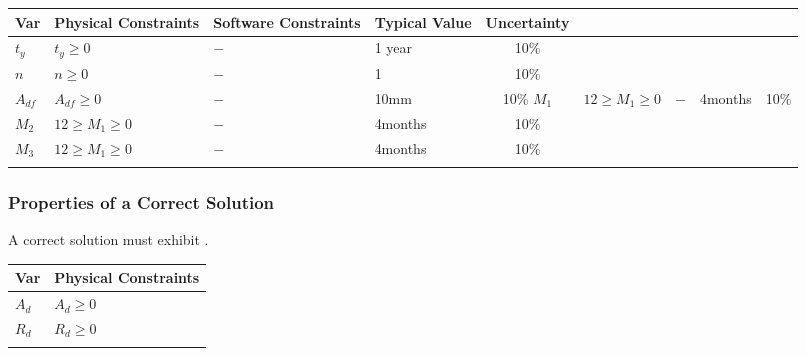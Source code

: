 \documentclass[12pt]{article}
\begin{document}
\begin{table}[!h]
  \caption{Input Variables} \label{TblInputVar}
  \renewcommand{\arraystretch}{1.2}
\noindent \begin{longtable*}{l l l l c} 
  \toprule
  \textbf{Var} & \textbf{Physical Constraints} & \textbf{Software Constraints} &
                             \textbf{Typical Value} & \textbf{Uncertainty}\\
  \midrule 
  $t_y$ & $t_y \ge 0$ & $-$ & 1 year & 10\% \\
  $n$ & $n \ge 0$ & $-$ & 1 & 10\% \\
  $A_{df}$ & $A_{df} \ge 0$ & $-$ & 10mm & 10\%
  $M_1$ & $12 \ge M_1 \ge 0$ & $-$ & 4months & 10\% \\
  $M_2$ & $12 \ge M_1 \ge 0$ & $-$ & 4months & 10\% \\
  $M_3$ & $12 \ge M_1 \ge 0$ & $-$ & 4months & 10\% \\
  \\
  \bottomrule
\end{longtable*}
\end{table}

\subsubsection{Properties of a Correct Solution} \label{sec_CorrectSolution}

\noindent
A correct solution must exhibit .  

\begin{table}[!h]
\caption{Output Variables} \label{TblOutputVar}
\renewcommand{\arraystretch}{1.2}
\noindent \begin{longtable*}{l l} 
  \toprule
  \textbf{Var} & \textbf{Physical Constraints} \\
  \midrule 
  $A_d$ & $A_d \ge 0$\\
  $R_d$ & $R_d \ge 0$\\
  \\
  \bottomrule
\end{longtable*}
\end{table}
\end{document}
